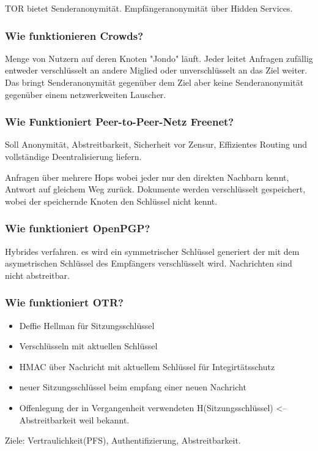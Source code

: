 	TOR bietet Senderanonymität. Empfängeranonymität über Hidden Services.
	
	\subsubsection{Wie funktionieren Crowds?}
	Menge von Nutzern auf deren Knoten "Jondo" läuft. Jeder leitet Anfragen zufällig  entweder verschlüsselt an andere Miglied oder unverschlüsselt an das Ziel weiter. Das bringt Senderanonymität gegenüber dem Ziel aber keine Senderanonymität gegenüber einem netzwerkweiten Lauscher.
	
	\subsubsection{Wie Funktioniert Peer-to-Peer-Netz Freenet?}
	Soll Anonymität, Abstreitbarkeit, Sicherheit vor Zensur, Effizientes Routing und vollständige Deentralisierung liefern.
	
	Anfragen über mehrere Hops wobei jeder nur den direkten Nachbarn kennt, Antwort auf gleichem Weg zurück.
	Dokumente werden verschlüsselt gespeichert, wobei der speichernde Knoten den Schlüssel nicht kennt.
	
	\subsubsection{Wie funktioniert OpenPGP?}
	Hybrides verfahren. es wird ein symmetrischer Schlüssel generiert der mit dem asymetrischen Schlüssel des Empfängers verschlüsselt wird. Nachrichten sind nicht abstreitbar.
	
	\subsubsection{Wie funktioniert OTR?}
	\begin{itemize}
		\item Deffie Hellman für Sitzungsschlüssel
		\item Verschlüsseln mit aktuellen Schlüssel
		\item HMAC über Nachricht mit aktuellem Schlüssel für Integirtätsschutz
		\item neuer Sitzungsschlüssel beim empfang einer neuen Nachricht
		\item Offenlegung der in Vergangenheit verwendeten H(Sitzungsschlüssel) <-- Abstreitbarkeit weil bekannt.
	\end{itemize}
	Ziele: Vertraulichkeit(PFS), Authentifizierung, Abstreitbarkeit.
